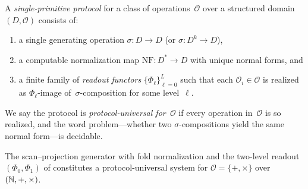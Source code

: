 \begin{definition}\label{def:prot-univ}
A \emph{single-primitive protocol} for a class of
operations~$\mathcal{O}$ over a structured domain~$(D, \mathcal{O})$
consists of:
\begin{enumerate}[label=(\alph*)]
\item a single generating operation $\sigma \colon D \to D$
  (or $\sigma \colon D^{k} \to D$),
\item a computable normalization map
  $\mathrm{NF} \colon D^{*} \to D$ with unique normal forms, and
\item a finite family of \emph{readout functors}
  $\{\Phi_{\ell}\}_{\ell=0}^{L}$ such that each
  $\mathcal{O}_{i} \in \mathcal{O}$ is realized as
  $\Phi_{\ell}$-image of~$\sigma$-composition for some level~$\ell$.
\end{enumerate}
We say the protocol is \emph{protocol-universal for~$\mathcal{O}$}
if every operation in~$\mathcal{O}$ is so realized, and
the word problem---whether two $\sigma$-compositions yield the
same normal form---is decidable.
\end{definition}

The scan--projection generator with fold normalization and the
two-level readout $(\Phi_{0}, \Phi_{1})$ of
 constitutes a protocol-universal system for
$\mathcal{O} = \{+, \times\}$ over~$(\mathbb{N}, +, \times)$.
